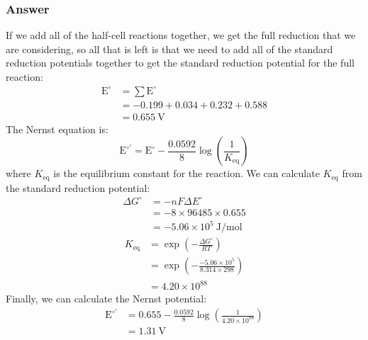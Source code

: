 \documentclass[12pt]{article}
\begin{document}
\subsubsection{Answer}
If we add all of the half-cell reactions together, we get the full reduction that we are considering, so all that is left is that we need to add all of the standard reduction potentials together to get the standard reduction potential for the full reaction:
\begin{equation}
\begin{aligned}
\mathrm{E}^{\circ} &=\sum \mathrm{E}^{\circ} \\
&=-0.199+0.034+0.232+0.588 \\
&=0.655 \mathrm{~V}
\end{aligned}
\end{equation}
The Nernst equation is:
\begin{equation}
\mathrm{E}^{\circ \prime}=\mathrm{E}^{\circ}-\frac{0.0592}{8} \log \left(\frac{1}{K_{\mathrm{eq}}}\right)
\end{equation}
where $K_{\mathrm{eq}}$ is the equilibrium constant for the reaction. We can calculate $K_{\mathrm{eq}}$ from the standard reduction potential:
\begin{equation}
\begin{aligned}
\Delta G^{\circ} &=-n F \Delta E^{\circ} \\
&=-8 \times 96485 \times 0.655 \\
&=-5.06 \times 10^{5} \mathrm{~J} / \mathrm{mol}
\end{aligned}
\end{equation}
\begin{equation}
\begin{aligned}
K_{\mathrm{eq}} &=\exp \left(-\frac{\Delta G^{\circ}}{R T}\right) \\
&=\exp \left(-\frac{-5.06 \times 10^{5}}{8.314 \times 298}\right) \\
&=4.20 \times 10^{88}
\end{aligned}
\end{equation}
Finally, we can calculate the Nernst potential:
\begin{equation}
\begin{aligned}
\mathrm{E}^{\circ \prime} &=0.655-\frac{0.0592}{8} \log \left(\frac{1}{4.20 \times 10^{88}}\right) \\
&=1.31 \mathrm{~V}
\end{aligned}
\end{equation}
\subsection{}
\end{document}
